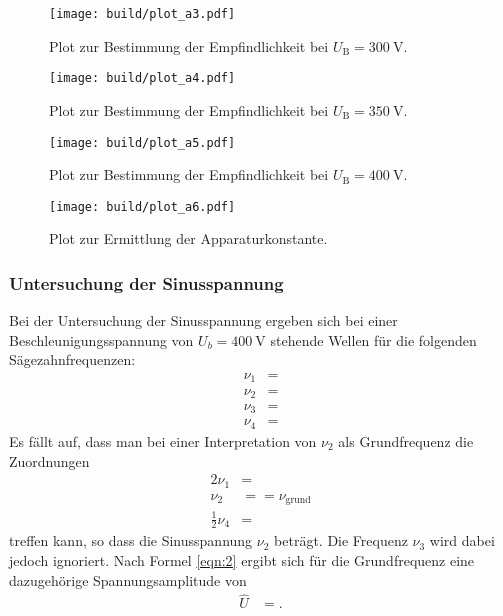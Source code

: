 \begin{figure}
  \centering
  \texttt{[image: build/plot\_a3.pdf]}
  \caption{Plot zur Bestimmung der Empfindlichkeit bei $U_{\text{B}} = \SI{300}{\volt}$.}
  \label{plot:3}
\end{figure}

\begin{figure}
  \centering
  \texttt{[image: build/plot\_a4.pdf]}
  \caption{Plot zur Bestimmung der Empfindlichkeit bei $U_{\text{B}} = \SI{350}{\volt}$.}
  \label{plot:4}
\end{figure}

\begin{figure}
  \centering
  \texttt{[image: build/plot\_a5.pdf]}
  \caption{Plot zur Bestimmung der Empfindlichkeit bei $U_{\text{B}} = \SI{400}{\volt}$.}
  \label{plot:5}
\end{figure}

\begin{figure}
  \centering
  \texttt{[image: build/plot\_a6.pdf]}
  \caption{Plot zur Ermittlung der Apparaturkonstante.}
  \label{plot:6}
\end{figure}

\clearpage


\subsubsection{Untersuchung der Sinusspannung}
Bei der Untersuchung der Sinusspannung ergeben sich bei einer Beschleunigungsspannung von $U_b = \SI{400}{\volt}$ stehende Wellen für die folgenden Sägezahnfrequenzen:
\begin{align*}
  \nu_1 &=  \\
  \nu_2 &=  \\
  \nu_3 &=  \\
  \nu_4 &= 
\end{align*}
Es fällt auf, dass man bei einer Interpretation von $\nu_2$ als Grundfrequenz die Zuordnungen
\begin{align*}
  2\nu_1  &=  \\
  \nu_2 &=  = \nu_\text{grund}\\
  \frac{1}{2}\nu_4 &= 
\end{align*}
treffen kann, so dass die Sinusspannung $\nu_2$ beträgt.
Die Frequenz $\nu_3$ wird dabei jedoch ignoriert.
Nach Formel \eqref{eqn:2} ergibt sich für die Grundfrequenz eine dazugehörige Spannungsamplitude von
\begin{align*}
  \hat{U} &= .
\end{align*}

